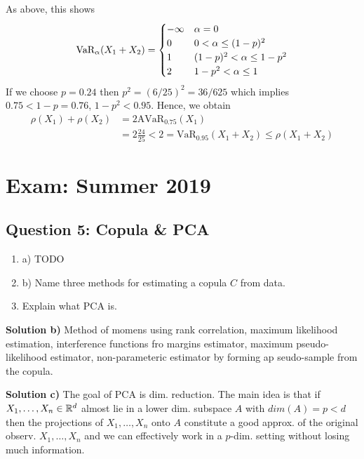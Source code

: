 As above, this shows
\[
    \text{VaR}_\alpha(X_1+X_2) =
    \begin{cases}
        -\infty & \alpha = 0 \\
        0 & 0 < \alpha \leq (1-p)^2 \\
        1 & (1-p)^2 < \alpha \leq 1-p^2 \\
        2 & 1-p^2 < \alpha \leq 1
    \end{cases}
\]
If we choose $p=0.24$ then $p^2 = (6/25)^2 = 36/625$ which implies $0.75 < 1-p = 0.76$, $1-p^2 < 0.95$. Hence, we obtain
\begin{align*}
    \rho(X_1) + \rho(X_2) &= 2 \text{AVaR}_{0.75}(X_1) \\
    &= 2 \frac{24}{25} < 2 = \text{VaR}_{0.95}(X_1 + X_2) \leq \rho(X_1 + X_2)
\end{align*}


%
%
\section*{Exam: Summer 2019}
\subsection*{Question 5: Copula \& PCA}
\begin{enumerate}[label=(\alph*)]
    \item a) TODO
    \item b) Name three methods for estimating a copula $C$ from data.
    \item Explain what PCA is.
\end{enumerate}

\textbf{Solution b)} Method of momens using rank correlation, maximum likelihood estimation, interference functions fro margins estimator, maximum pseudo-likelihood estimator, non-parameteric estimator by forming ap seudo-sample from the copula.

\textbf{Solution c)} The goal of PCA is dim. reduction. The main idea is that if $X_1, \dots, X_n \in \mathbb{R}^d$ almost lie in a lower dim. subspace $A$ with $dim(A) = p < d$ then the projections of $X_1 , \dots , X_n$ onto $A$ constitute a good approx. of the original observ. $X_1 , \dots, X_n$ and we can effectively work in a $p$-dim. setting without losing much information.


